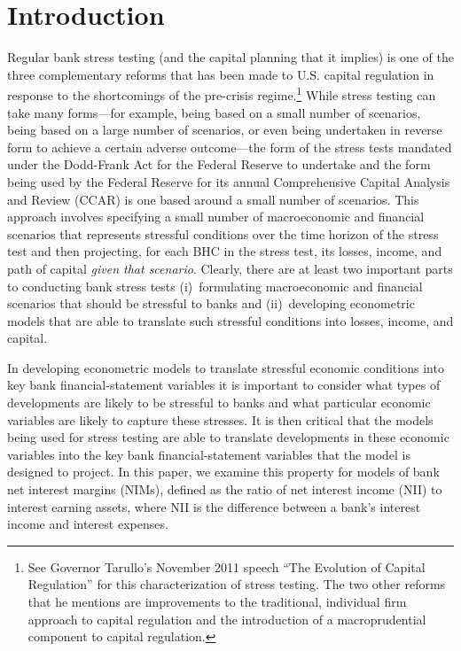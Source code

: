 \documentclass[11pt]{article}
\renewcommand{\baselinestretch}{1.5}
\begin{document}
\newpage
\setcounter{page}{1}

\section{Introduction}

\vspace{-0.1in}
Regular bank stress testing (and the capital planning that it implies) is one of the three complementary reforms that has been made to U.S. capital regulation in response to the shortcomings of the pre-crisis regime.\renewcommand{\baselinestretch}{1}\footnote{See Governor Tarullo’s November 2011 speech ``The Evolution of Capital Regulation'' for this characterization of stress testing. The two other reforms that he mentions are improvements to the traditional, individual firm approach to capital regulation and the introduction of a macroprudential component to capital regulation.\vspace{0.05in}}\renewcommand{\baselinestretch}{1.5} While stress testing can take many forms---for example, being based on a small number of scenarios, being based on a large number of scenarios, or even being undertaken in reverse form to achieve a certain adverse outcome---the form of the stress tests mandated under the Dodd-Frank Act for the Federal Reserve to undertake and the form being used by the Federal Reserve for its annual Comprehensive Capital Analysis and Review (CCAR) is one based around a small number of scenarios.  This approach involves specifying a small number of macroeconomic and financial scenarios that represents stressful conditions over the time horizon of the stress test and then projecting, for each BHC in the stress test, its losses, income, and path of capital \textit{given that scenario}. Clearly, there are at least two important parts to conducting bank stress tests (i)~formulating macroeconomic and financial scenarios that should be stressful to banks and (ii)~developing econometric models that are able to translate such stressful conditions into losses, income, and capital.

In developing econometric models to translate stressful economic conditions into key bank financial-statement variables it is important to consider what types of developments are likely to be stressful to banks and what particular economic variables are likely to capture these stresses. It is then critical that the models being used for stress testing are able to translate developments in these economic variables into the key bank financial-statement variables that the model is designed to project.  In this paper, we examine this property for models of bank net interest margins (NIMs), defined as the ratio of net interest income (NII) to interest earning assets, where NII is the difference between a bank's interest income and interest expenses.
\end{document}
